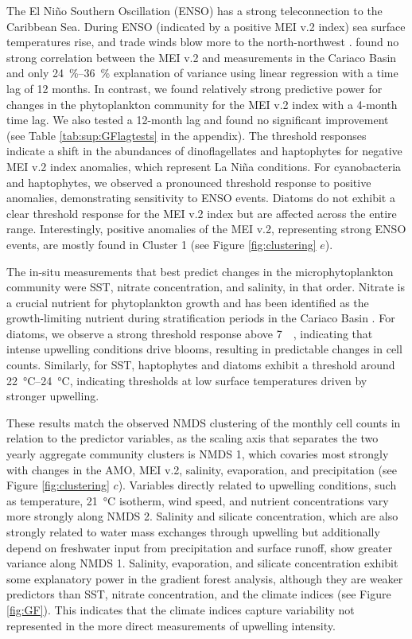\documentclass[draft]{agujournal2019}
\begin{document}
The El Niño Southern Oscillation (ENSO) has a strong teleconnection to the Caribbean Sea. During ENSO (indicated by a positive MEI v.2 index) sea surface temperatures rise, and trade winds blow more to the north-northwest \cite{enfield_tropical_1997}.  found no strong correlation between the MEI v.2 and measurements in the Cariaco Basin and only \qtyrange{24}{36}{\%} explanation of variance using linear regression with a time lag of 12 months. In contrast, we found relatively strong predictive power for changes in the phytoplankton community for the MEI v.2 index with a 4-month time lag. We also tested a 12-month lag and found no significant improvement (see Table \ref{tab:sup:GFlagtests} in the appendix).
The threshold responses indicate a shift in the abundances of dinoflagellates and haptophytes for negative MEI v.2 index anomalies, which represent La Niña conditions. For cyanobacteria and haptophytes, we observed a pronounced threshold response to positive anomalies, demonstrating sensitivity to ENSO events. Diatoms do not exhibit a clear threshold response for the MEI v.2 index but are affected across the entire range. Interestingly, positive anomalies of the MEI v.2, representing strong ENSO events, are mostly found in Cluster 1 (see Figure \ref{fig:clustering} $e$). 

The in-situ measurements that best predict changes in the microphytoplankton community were SST, nitrate concentration, and salinity, in that order. Nitrate is a crucial nutrient for phytoplankton growth and has been identified as the growth-limiting nutrient during stratification periods in the Cariaco Basin \cite{muller-karger_scientific_2019}. For diatoms, we observe a strong threshold response above \qty{7}{\micro \molar}, indicating that intense upwelling conditions drive blooms, resulting in predictable changes in cell counts. Similarly, for SST, haptophytes and diatoms exhibit a threshold around \qtyrange{22}{24}{\celsius}, indicating thresholds at low surface temperatures driven by stronger upwelling.

These results match the observed NMDS clustering of the monthly cell counts in relation to the predictor variables, as the scaling axis that separates the two yearly aggregate community clusters is NMDS 1, which covaries most strongly with changes in the AMO, MEI v.2, salinity, evaporation, and precipitation (see Figure \ref{fig:clustering} $c$). Variables directly related to upwelling conditions, such as temperature, \qty{21}{\celsius} isotherm, wind speed, and nutrient concentrations vary more strongly along NMDS 2. Salinity and silicate concentration, which are also strongly related to water mass exchanges through upwelling but additionally depend on freshwater input from precipitation and surface runoff, show greater variance along NMDS 1. Salinity, evaporation, and silicate concentration exhibit some explanatory power in the gradient forest analysis, although they are weaker predictors than SST, nitrate concentration, and the climate indices (see Figure \ref{fig:GF}). This indicates that the climate indices capture variability not represented in the more direct measurements of upwelling intensity. 
\end{document}
